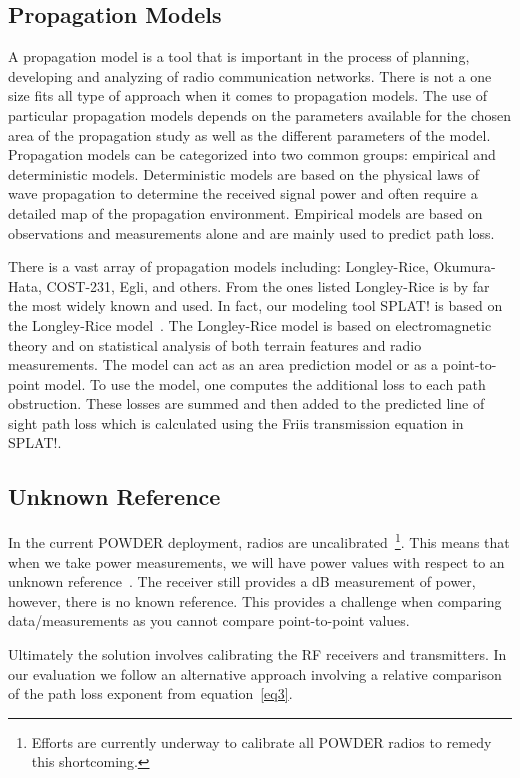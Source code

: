 \subsection{Propagation Models}
A propagation model is a tool that is important in the process of planning, developing and analyzing of radio communication 
networks. There is not a one size fits all type of approach when it comes to propagation models. The use of particular 
propagation models depends on the parameters available for the chosen area of the propagation study as well as the 
different parameters of the model. Propagation models can be categorized into two common groups: empirical and 
deterministic models. Deterministic models are based on the physical laws of wave propagation to determine the received 
signal power and often require a detailed map of the propagation environment. Empirical models are based on observations 
and measurements alone and are mainly used to predict path loss.

There is a vast array of propagation models including: Longley-Rice, Okumura-Hata, COST-231, Egli, and others. From the ones 
listed Longley-Rice is by far the most widely known and used. In fact, our modeling tool SPLAT! is based on the Longley-Rice 
model~\cite{b6}. The Longley-Rice model is based on electromagnetic theory and on statistical analysis of both 
terrain features and radio measurements. The model can act as an area prediction model or as a point-to-point model. To use
the model, one computes the additional loss to each path obstruction. These losses are summed and then added to the 
predicted line of sight path loss which is calculated using the Friis transmission equation in SPLAT!.

\subsection{Unknown Reference}
In the current POWDER deployment, radios are uncalibrated~\footnote{Efforts are currently underway to calibrate all POWDER radios to remedy this shortcoming.}. This means that when we take power measurements, we will have
power values with respect to an unknown reference~\cite{b5}. The receiver still provides a dB measurement 
of power, however, there is no known reference. 
This provides a challenge when comparing data/measurements as you cannot compare point-to-point values. 

Ultimately the solution involves calibrating the RF receivers and transmitters.  In our evaluation we follow an alternative approach involving a relative comparison of the
path loss exponent from equation~\ref{eq3}.
